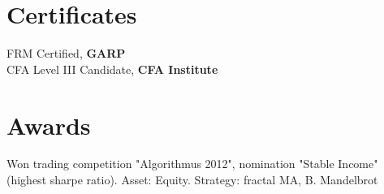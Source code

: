 \documentclass[a4paper,20pt]{article}
\newcommand{\resumeSubHeadingListStart}{\begin{itemize}[leftmargin=0.15in, label={}]}
\newcommand{\resumeSubHeadingListEnd}{\end{itemize}}
\begin{document}
\vspace{-10pt}
\section{Certificates}
  \resumeSubHeadingListStart
    \small{\item{
      {FRM Certified, \textbf{GARP}} \\ \vspace{2pt}
      {CFA Level III Candidate,}\textbf{ CFA Institute} %
    }}    
  \resumeSubHeadingListEnd

\vspace{-10pt}
\section{Awards}
	\begin{description}%
		\item{Won trading competition "Algorithmus 2012", nomination "Stable Income" (highest sharpe ratio). Asset: Equity. Strategy: fractal MA, B. Mandelbrot}
		\vspace{-5pt}		
\end{description}
\end{document}
